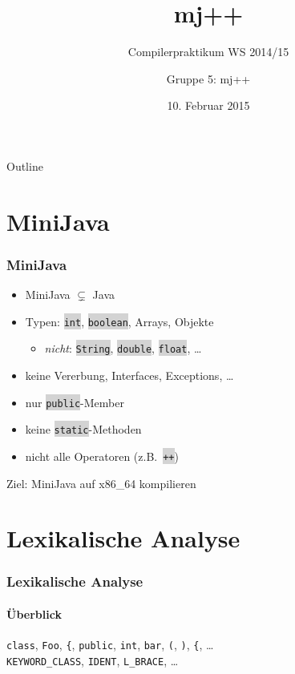 \documentclass[18pt]{beamer}
\title[]{mj++}
\subtitle{Compilerpraktikum WS 2014/15}
\author{Gruppe 5: mj++}
\date{10. Februar 2015}
\institute{Institut für Programmstrukturen und Datenorganistation}
\newcommand{\code}[1]{\colorbox{lightgray}{\texttt{\upshape #1}}}
\newcommand{\token}[1]{\colorbox{kitblue}{\texttt{\upshape #1}}}
\begin{document}

\begin{frame}
\titlepage
\end{frame}

\begin{frame}{Outline}
\tableofcontents
\end{frame}

\section{MiniJava}

\begin{frame}
    \frametitle{MiniJava}
    \begin{itemize}
        \item MiniJava $\subsetneq$ Java
        \item Typen: \code{int}, \code{boolean}, Arrays, Objekte
            \begin{itemize}
                \item \emph{nicht}: \code{String}, \code{double}, \code{float}, \ldots
            \end{itemize}
        \item keine Vererbung, Interfaces, Exceptions, \ldots
        \item nur \code{public}-Member
        \item keine \code{static}-Methoden
        \item nicht alle Operatoren (z.B.\ \code{++})
    \end{itemize}
    \vskip 1cm
    \begin{center}
        Ziel: MiniJava auf x86\_64 kompilieren
    \end{center}
\end{frame}

\section{Lexikalische Analyse}

\begin{frame}
    \frametitle{Lexikalische Analyse}
    \framesubtitle{Überblick}
    
    \token{class}, \token{Foo}, \token{\{}, \token{public}, \token{int}, \token{bar}, \token{(}, \token{)}, \token{\{}, \ldots \\
            \texttt{KEYWORD\_CLASS}, \texttt{IDENT}, \texttt{L\_BRACE}, \ldots
\end{frame}
\end{document}
